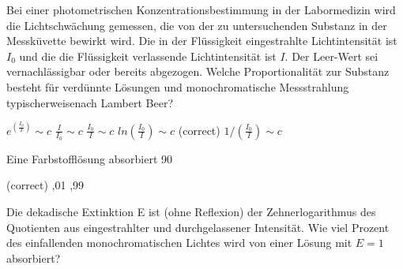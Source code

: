 \documentclass[11pt]{exam}
\begin{document}
\setlength{\voffset}{-0.5in}
\setlength{\headsep}{5pt}

\hspace{2mm}
 \hspace{5mm}
\vspace{4mm}

\begin{questions}

\question Bei einer photometrischen Konzentrationsbestimmung in der Labormedizin wird die Lichtschwächung gemessen, die von der zu untersuchenden Substanz in der Messküvette bewirkt wird. Die in der Flüssigkeit eingestrahlte Lichtintensität ist \( I_0 \) und die die Flüssigkeit verlassende Lichtintensität ist \(I\). Der Leer-Wert sei vernachlässigbar oder bereits abgezogen. Welche Proportionalität zur Substanz besteht für verdünnte Lösungen und monochromatische Messstrahlung typischerweisenach Lambert Beer?

\begin{choices}
	\choice \( e^{( \frac{I_0}{I})} \sim c \)
	\choice \( \frac{I}{I_0} \sim c \)
	\choice \( \frac{I_0}{I} \sim c \)
	\choice \( ln ( \frac{I_0}{I}) \sim c \) (correct)
	\choice \( 1/( \frac{I_0}{I}) \sim c \)
\end{choices}

\vspace{3mm}\question Eine Farbstofflösung absorbiert 90 %

\begin{choices}
	 (correct)
	,01
	,99
\end{choices}

\vspace{3mm}\question Die dekadische Extinktion E ist (ohne Reflexion) der Zehnerlogarithmus des Quotienten aus eingestrahlter und durchgelassener Intensität. Wie viel Prozent des einfallenden monochromatischen Lichtes wird von einer Lösung mit \(E = 1\) absorbiert?

\begin{choices}
\end{choices}


\end{questions}
\end{document}
